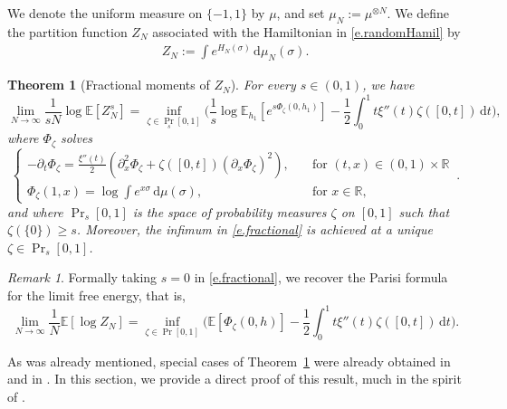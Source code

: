 \documentclass[11pt]{amsart}
\newtheorem{theorem}[proposition]{Theorem}
\theoremstyle{remark}
\newtheorem{remark}[proposition]{Remark}
\theoremstyle{definition}
\numberwithin{equation}{section}
\numberwithin{proposition}{section}
\numberwithin{figure}{section}
\numberwithin{table}{section}
\newcommand{\R}{\mathbb{R}}
\newcommand{\E}{\mathbb{E}}
\renewcommand{\ge}{\geqslant}
\newcommand{\Ll}{\left}
\newcommand{\Rr}{\right}
\renewcommand{\d}{\mathrm{d}}
\newcommand{\1}{\mathbf{1}}
\begin{document}
We denote the uniform measure on $\{-1,1\}$ by $\mu$, and set $\mu_N := \mu^{\otimes N}$. 
We define the partition function $Z_N$ associated with the Hamiltonian in \eqref{e.randomHamil}  by 
\begin{align}\label{e.Z_N=}
Z_N := \int e^{H_N(\sigma) } \, \d\mu_N(\sigma). 
\end{align}


\begin{theorem}[Fractional moments of $Z_N$]\label{t.fractional}
For every $s \in (0,1)$, we have
\begin{equation}
\label{e.fractional}
\lim_{N\to \infty} \frac{1}{sN} \log \E \Ll[ Z_N^s \Rr] =  \inf_{\zeta \in \Pr_s[0,1]}\bigg(  \frac 1 s \log \E_{h_1} \Ll[ e^{s \Phi_\zeta(0,h_1)} \Rr] - \frac{1}{2} \int_0^1 t \xi''(t) \zeta([0,t]) \, \d t \bigg),
\end{equation}
where $\Phi_\zeta$ solves
\begin{equation}\label{eq:parisipdefinite}
	\begin{cases}
		-\partial_t \Phi_{\zeta} =  \frac{\xi''(t)}{2} ( \partial_{x}^2 \Phi_\zeta + \zeta([0,t]) ( \partial_x \Phi_\zeta )^2), & \quad \text{for } (t,x) \in (0,1) \times \R \\
		\Phi_{\zeta}(1,x) = \log \int e^{x \sigma} \, \d\mu(\sigma), & \quad \text{for } x \in \R,
	\end{cases}
	\, .
\end{equation}
and where $\Pr_s[0,1]$ is the space of probability measures $\zeta$ on $[0,1]$ such that $\zeta(\{0\}) \ge s$. Moreover, the infimum in \eqref{e.fractional} is achieved at a unique $\zeta \in \Pr_s[0,1]$. 
\end{theorem}
\begin{remark}  
Formally taking $s = 0$ in \eqref{e.fractional}, we recover the Parisi formula for the limit free energy, that is,
\begin{equation*}
\lim_{N\to \infty} \frac{1}{N} \E\Ll[ \log  Z_N \Rr] =  \inf_{\zeta \in \Pr[0,1]}\bigg(  \E\Ll[\Phi_\zeta(0,h)\Rr] - \frac{1}{2} \int_0^1 t \xi''(t) \zeta([0,t]) \, \d t \bigg).
\end{equation*}
\end{remark}

As was already mentioned, special cases of Theorem~\ref{t.fractional} were already obtained in \cite{talagrand2007large} and in \cite{conmin}. In this section, we provide a direct proof of this result, much in the spirit of \cite{conmin}. 
\end{document}
